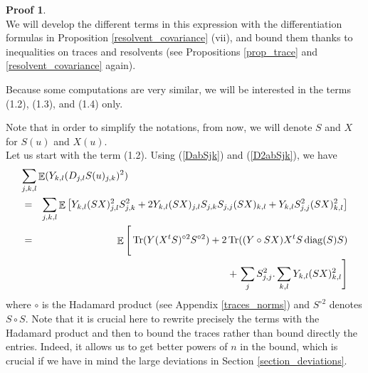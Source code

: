 \documentclass[11pt,a4paper]{article}
\DeclareMathOperator{\E}{\mathbb{E}}
\DeclareMathOperator{\1}{\mathbf{1}}
\DeclareMathOperator{\Tr}{\mathrm{Tr}}
\DeclareMathOperator{\diag}{\mathrm{diag}}
\theoremstyle{definition}
\newtheorem*{Proof}{Proof}
\begin{document}
\begin{Proof}
\noindent {}\\
We will develop the different terms in this expression with the differentiation formulas in Proposition \ref{resolvent_covariance} (vii), and bound them thanks to inequalities on traces and resolvents (see Propositions \ref{prop_trace} and \ref{resolvent_covariance} again).

Because some computations are very similar, we will be interested in the terms (1.2), (1.3), and (1.4) only.

Note that in order to simplify the notations, from now, we will denote $S$ and $X$ for $S(u)$ and $X(u)$.\\

Let us start with the term (1.2). Using (\ref{DabSjk}) and (\ref{D2abSjk}), we have
\begin{eqnarray*}
\lefteqn{   \sum_{j,k,l} \E (Y_{k,l}(D_{j,l}S(u)_{j,k})^2)   } \\
& = & \sum_{j,k,l} \E \left[ Y_{k,l} (SX)_{j,l}^2 S_{j,k}^2 + 2 Y_{k,l} (SX)_{j,l} S_{j,k} S_{j,j} (SX)_{k,l} + Y_{k,l} S_{j,j}^2 (SX)_{k,l}^2 \right] \\
& = & \E \Bigg[ \Tr( Y(X^tS)^{\circ 2} S^{\circ 2} ) + 2 \Tr( (Y \circ SX)X^tS\diag(S)S ) \\
& & \quad + \, \sum_j S_{j,j}^2 . \sum_{k,l} Y_{k,l} (SX)_{k,l}^2 \Bigg]
\end{eqnarray*}
where $\circ$ is the Hadamard product (see Appendix \ref{traces_norms}) and $S^{\circ 2}$ denotes $S \circ S$. Note that it is crucial here to rewrite precisely the terms with the Hadamard product and then to bound the traces rather than bound directly the entries. Indeed, it allows us to get better powers of $n$ in the bound, which is crucial if we have in mind the large deviations in Section \ref{section_deviations}.


\end{Proof}
\end{document}
